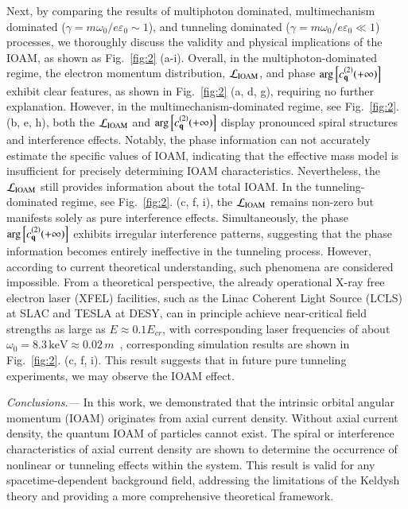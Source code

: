 \documentclass[prl,twocolumn,floatfix,amsmath,nofootinbib,superscriptaddress,amssymb,preprintnumbers,floatfix]{revtex4-1}
\begin{document}
Next, by comparing the results of multiphoton dominated, multimechanism dominated ($\gamma=m\omega_{0}/e\varepsilon_{0}\sim 1$), and tunneling dominated ($\gamma=m\omega_{0}/e\varepsilon_{0}\ll 1$) processes, we thoroughly discuss the validity and physical implications of the IOAM, as shown as Fig.~\ref{fig:2} (a-i).
Overall, in the multiphoton-dominated regime, the electron momentum distribution, $\mathcal{L}_{\rm IOAM}$, and phase $\arg\left[c_{\bf{q}}^{(2)}(+\infty)\right]$ exhibit clear features, as shown in Fig.~\ref{fig:2} (a, d, g), requiring no further explanation. However, in the multimechanism-dominated regime, see Fig.~\ref{fig:2}. (b, e, h), both the $\mathcal{L}_{\rm IOAM}$ and $\arg\left[c_{\bf{q}}^{(2)}(+\infty)\right]$ display pronounced spiral structures and interference effects. Notably, the phase information can not accurately estimate the specific values of IOAM, indicating that the effective mass model is insufficient for precisely determining IOAM characteristics. Nevertheless, the $\mathcal{L}_{\rm IOAM}$ still provides information about the total IOAM.
In the tunneling-dominated regime, see Fig.~\ref{fig:2}. (c, f, i), the $\mathcal{L}_{\rm IOAM}$ remains non-zero but manifests solely as pure interference effects. Simultaneously, the phase $\arg\left[c_{\bf{q}}^{(2)}(+\infty)\right]$ exhibits irregular interference patterns, suggesting that the phase information becomes entirely ineffective in the tunneling process. However, according to current theoretical understanding, such phenomena are considered impossible.
From a theoretical perspective, the already operational X-ray free electron laser (XFEL) facilities, such as the Linac Coherent Light Source (LCLS) at SLAC and TESLA at DESY, can in principle achieve near-critical field strengths as large as $E \approx 0.1 E_{cr}$, with corresponding laser frequencies of about $\omega_{0} = 8.3 \, \text{keV} \approx 0.02 \, m$~\cite{Ringwald:2001ib}, corresponding simulation results are shown in Fig.~\ref{fig:2}. (c, f, i). This result suggests that in future pure tunneling experiments, we may observe the IOAM effect. 

\emph{Conclusions.---} 
In this work, we demonstrated that the intrinsic orbital angular momentum (IOAM) originates from axial current density. Without axial current density, the quantum IOAM of particles cannot exist. The spiral or interference characteristics of axial current density are shown to determine the occurrence of nonlinear or tunneling effects within the system. This result is valid for any spacetime-dependent background field, addressing the limitations of the Keldysh theory and providing a more comprehensive theoretical framework.
\end{document}

